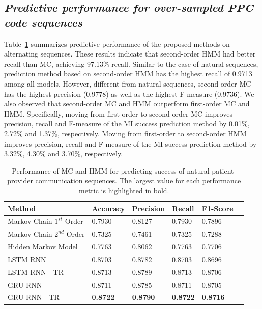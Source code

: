 \documentclass{amia_summit_2018}
\begin{document}
\subsection*{\textit{Predictive performance for over-sampled PPC code sequences}}
Table~\ref{tab:result_over_sampled} summarizes predictive performance of the proposed methods on alternating sequences. These results indicate that second-order HMM had better recall than MC, achieving 97.13\% recall. Similar to the case of natural sequences, prediction method based on second-order HMM has the highest recall of 0.9713 among all models. However, different from natural sequences, second-order MC has the highest precision (0.9778) as well as the highest F-measure (0.9736). We also observed that second-order MC and HMM outperform first-order MC and HMM. Specifically, moving from first-order to second-order MC improves precision, recall and F-measure of the MI success prediction method by 0.01\%, 2.72\% and 1.37\%, respectively. Moving from first-order to second-order HMM improves precision, recall and F-measure of the MI success prediction method by 3.32\%, 4.30\% and 3.70\%, respectively.\\

\begin{table}[h]
\centering
\caption{Performance of MC and HMM for predicting success of natural patient-provider communication sequences. The largest value for each performance metric is highlighted in bold.}
\label{tab:result_over_sampled}
  \begin{tabular}{|l|l|l|l|l|l|}
  \hline
   \textbf{Method} & \textbf{Accuracy}  & \textbf{Precision}  & \textbf{Recall} & \textbf{F1-Score}\\ \hline    
    
 Markov Chain $1^{st}$ Order & 0.7930 & 0.8127 & 0.7930 & 0.7896\\ \hline
 Markov Chain $2^{nd}$ Order & 0.7325 & 0.7461 & 0.7325 & 0.7288\\ \hline
 Hidden Markov Model & 0.7763 & 0.8062 & 0.7763 & 0.7706\\ \hline
 LSTM RNN & 0.8703 & 0.8782 & 0.8703 & 0.8696\\ \hline
 LSTM RNN - TR & 0.8713 & 0.8789 & 0.8713 & 0.8706\\ \hline
 GRU RNN & 0.8711 & 0.8785 & 0.8711 & 0.8705\\ \hline
 GRU RNN - TR & \textbf{0.8722} & \textbf{0.8790} & \textbf{0.8722} & \textbf{0.8716}\\ \hline
  \end{tabular}
\end{table}
\end{document}
